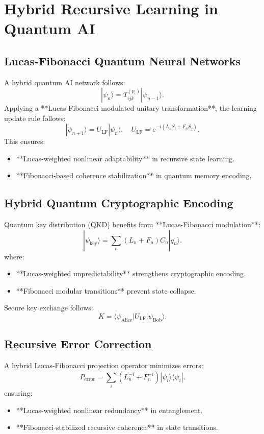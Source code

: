 \documentclass{article}
\theoremstyle{plain}
\begin{document}
\section{Hybrid Recursive Learning in Quantum AI}
\subsection{Lucas-Fibonacci Quantum Neural Networks}
A hybrid quantum AI network follows:
\begin{equation}
    |\psi_n\rangle = T^{(p_i)}_{ijk} |\psi_{n-1}\rangle.
\end{equation}
Applying a **Lucas-Fibonacci modulated unitary transformation**, the learning update rule follows:
\begin{equation}
    |\psi_{n+1}\rangle = U_{\text{LF}} |\psi_n\rangle, \quad U_{\text{LF}} = e^{-i (L_n S_i + F_n S_j)}.
\end{equation}
This ensures:
\begin{itemize}
    \item **Lucas-weighted nonlinear adaptability** in recursive state learning.
    \item **Fibonacci-based coherence stabilization** in quantum memory encoding.
\end{itemize}

\subsection{Hybrid Quantum Cryptographic Encoding}
Quantum key distribution (QKD) benefits from **Lucas-Fibonacci modulation**:
\begin{equation}
    |\psi_{\text{key}}\rangle = \sum_{n} (L_n + F_n) C_n |q_n\rangle.
\end{equation}
where:
\begin{itemize}
    \item **Lucas-weighted unpredictability** strengthens cryptographic encoding.
    \item **Fibonacci modular transitions** prevent state collapse.
\end{itemize}
Secure key exchange follows:
\begin{equation}
    K = \langle \psi_{\text{Alice}} | U_{\text{LF}} | \psi_{\text{Bob}} \rangle.
\end{equation}

\subsection{Recursive Error Correction}
A hybrid Lucas-Fibonacci projection operator minimizes errors:
\begin{equation}
    P_{\text{error}} = \sum_{i} (L_n^{-i} + F_n^{-i}) |\psi_i\rangle \langle \psi_i |.
\end{equation}
ensuring:
\begin{itemize}
    \item **Lucas-weighted nonlinear redundancy** in entanglement.
    \item **Fibonacci-stabilized recursive coherence** in state transitions.
\end{itemize}
\end{document}
